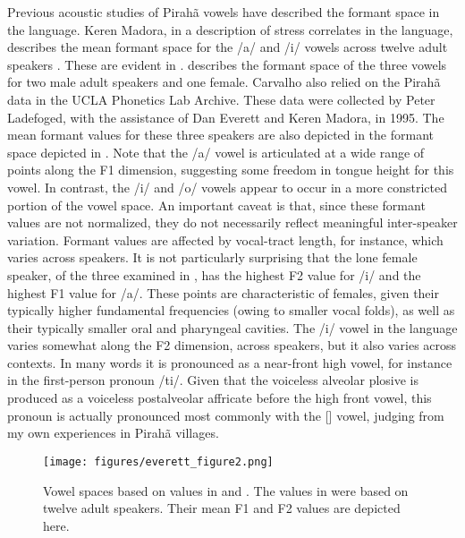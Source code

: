\documentclass[output=paper,colorlinks,citecolor=brown
]{langscibook}
\begin{document}
    Previous acoustic studies of Pirahã vowels have described the formant space in the language. Keren Madora, in a description of stress correlates in the language, describes the mean formant space for the /a/ and /i/ vowels across twelve adult speakers \citep{everett1998acoustic}. These are evident in .  describes the formant space of the three vowels for two male adult speakers and one female. Carvalho also relied on the Pirahã data in the UCLA Phonetics Lab Archive. These data were collected by Peter Ladefoged, with the assistance of Dan Everett and Keren Madora, in 1995. The mean formant values for these three speakers are also depicted in the formant space depicted in . Note that the /a/ vowel is articulated at a wide range of points along the F1 dimension, suggesting some freedom in tongue height for this vowel. In contrast, the /i/ and /o/ vowels appear to occur in a more constricted portion of the vowel space. An important caveat is that, since these formant values are not normalized, they do not necessarily reflect meaningful inter-speaker variation. Formant values are affected by vocal-tract length, for instance, which varies across speakers. It is not particularly surprising that the lone female speaker, of the three examined in , has the highest F2 value for /i/ and the highest F1 value for /a/. These points are characteristic of females, given their typically higher fundamental frequencies (owing to smaller vocal folds), as well as their typically smaller oral and pharyngeal cavities. The /i/ vowel in the language varies somewhat along the F2 dimension, across speakers, but it also varies across contexts. In many words it is pronounced as a near-front high vowel, for instance in the first-person pronoun /ti/. Given that the voiceless alveolar plosive is produced as a voiceless postalveolar affricate before the high front vowel, this pronoun is actually pronounced most commonly with the [{\textsci}] vowel, judging from my own experiences in Pirahã villages.
    
\begin{figure}
\texttt{[image: figures/everett\_figure2.png]}
\caption{\label{everett-figure-2}Vowel spaces based on values in  and . The values in  were based on twelve adult speakers. Their mean F1 and F2 values are depicted here.}
\end{figure}
\end{document}
